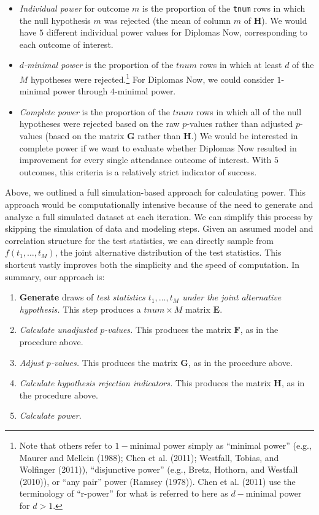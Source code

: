\documentclass{article}
\providecommand{\tightlist}{%
  \setlength{\itemsep}{0pt}\setlength{\parskip}{0pt}}
\begin{document}
\begin{itemize}
\item
  \emph{Individual power} for outcome \(m\) is the proportion of the
  \texttt{tnum} rows in which the null hypothesis \(m\) was rejected
  (the mean of column \(m\) of \(\mathbf{H}\)). We would have \(5\)
  different individual power values for Diplomas Now, corresponding to
  each outcome of interest.
\item
  \emph{\(d\)-minimal power} is the proportion of the \(tnum\) rows in
  which at least \(d\) of the \(M\) hypotheses were rejected.\footnote{Note
    that others refer to \(1-\)minimal power simply as ``minimal power''
    (e.g., Maurer and Mellein (1988); Chen et al. (2011); Westfall,
    Tobias, and Wolfinger (2011)), ``disjunctive power'' (e.g., Bretz,
    Hothorn, and Westfall (2010)), or ``any pair'' power (Ramsey
    (1978)). Chen et al. (2011) use the terminology of ``r-power'' for
    what is referred to here as \(d-\)minimal power for \(d>1\).} For
  Diplomas Now, we could consider \(1\)-minimal power through
  \(4\)-minimal power.
\item
  \emph{Complete power} is the proportion of the \(tnum\) rows in which
  all of the null hypotheses were rejected based on the raw \(p\)-values
  rather than adjusted \(p\)-values (based on the matrix \(\mathbf{G}\)
  rather than \(\mathbf{H}\).) We would be interested in complete power
  if we want to evaluate whether Diplomas Now resulted in improvement
  for every single attendance outcome of interest. With \(5\) outcomes,
  this criteria is a relatively strict indicator of success.
\end{itemize}

Above, we outlined a full simulation-based approach for calculating
power. This approach would be computationally intensive because of the
need to generate and analyze a full simulated dataset at each iteration.
We can simplify this process by skipping the simulation of data and
modeling steps. Given an assumed model and correlation structure for the
test statistics, we can directly sample from \(f(t_1, \dots, t_M)\), the
joint alternative distribution of the test statistics. This shortcut
vastly improves both the simplicity and the speed of computation. In
summary, our approach is:

\begin{enumerate}
\def\labelenumi{\arabic{enumi}.}
\tightlist
\item
  \textbf{Generate} draws of \emph{test statistics \(t_1, \dots, t_M\)
  under the joint alternative hypothesis.} This step produces a
  \(tnum \times M\) matrix \(\mathbf{E}\).
\item
  \emph{Calculate unadjusted \(p\)-values.} This produces the matrix
  \(\mathbf{F}\), as in the procedure above.
\item
  \emph{Adjust \(p\)-values.} This produces the matrix \(\mathbf{G}\),
  as in the procedure above.
\item
  \emph{Calculate hypothesis rejection indicators.} This produces the
  matrix \(\mathbf{H}\), as in the procedure above.
\item
  \emph{Calculate power.}
\end{enumerate}
\end{document}
